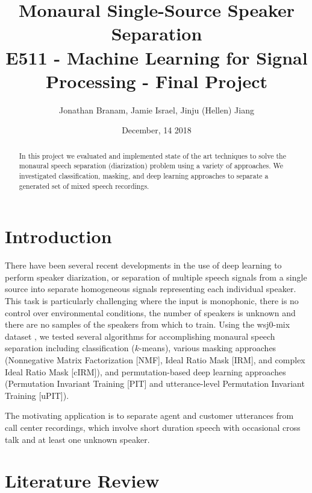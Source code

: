 \documentclass[journal, a4paper]{IEEEtran}
\begin{document}
	\title{Monaural Single-Source Speaker Separation \\
	{\large E511 - Machine Learning for Signal Processing - Final Project}}
	\author{Jonathan Branam, Jamie Israel, Jinju (Hellen) Jiang}
	\date{December, 14 2018}
	\maketitle
%
\begin{abstract}
In this project we evaluated and implemented state of the art techniques to solve the monaural speech separation (diarization) problem using a variety of approaches. We investigated classification, masking, and deep learning approaches to separate a generated set of mixed speech recordings.
\end{abstract}

\section{Introduction}
There have been several recent developments in the use of deep learning to perform speaker diarization, or separation of multiple speech signals from a single source into separate homogeneous signals representing each individual speaker. This task is particularly challenging where the input is monophonic, there is no control over environmental conditions, the number of speakers is unknown and there are no samples of the speakers from which to train. Using the wsj0-mix dataset \cite{wsjmix}, we tested several algorithms for accomplishing monaural speech separation including classification ($k$-means), various masking approaches (Nonnegative Matrix Factorization [NMF], Ideal Ratio Mask [IRM], and complex Ideal Ratio Mask [cIRM]), and permutation-based deep learning approaches (Permutation Invariant Training [PIT] and utterance-level Permutation Invariant Training [uPIT]).

The motivating application is to separate agent and customer utterances from call center recordings, which involve short duration speech with occasional cross talk and at least one unknown speaker.

\section{Literature Review}
\end{document}
